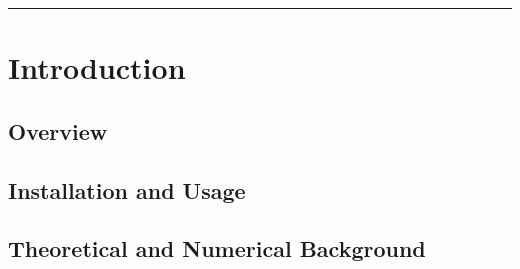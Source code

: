 \documentclass[tocAsPDFpart]{fipy}
\begin{document}
\doparttoc

\frontmatter

\title{\FiPy{}}
\subtitle{A Finite Volume PDE Solver Using Python}

\author{Daniel Wheeler \and Jonathan E. Guyer \and James A. Warren}

\maketitle

\vspace*{\fill}



\rule{\textwidth}{0.1pt}



\tableofcontents

\mainmatter


\part{Introduction}


\parttoc


\chapter{Overview}


  


\chapter{Installation and Usage}
\label{chap:Installation}





\chapter{Theoretical and Numerical Background}
\label{chap:Numerics}
\end{document}
